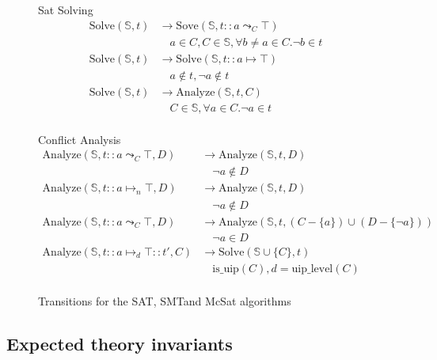 \begin{figure}
  \begin{center}
    Sat Solving
    \begin{align*}
      \text{Solve}(\mathbb{S}, t) &\rightarrow \text{Sove}(\mathbb{S}, t :: a \leadsto_C \top) \\
      &\quad a \in C, C \in \mathbb{S}, \forall b \neq a \in C. \neg b \in t \\
      \text{Solve}(\mathbb{S}, t) &\rightarrow \text{Solve}(\mathbb{S}, t :: a \mapsto \top) \\
      &\quad a \notin t, \neg a \notin t \\
      \text{Solve}(\mathbb{S}, t) &\rightarrow \text{Analyze}(\mathbb{S}, t, C) \\
      &\quad C \in \mathbb{S}, \forall a \in C. \neg a \in t \\
    \end{align*}

    Conflict Analysis
    \begin{align*}
      \text{Analyze}(\mathbb{S}, t :: a \leadsto_C \top, D) &\rightarrow \text{Analyze}(\mathbb{S}, t, D) \\
      &\quad \neg a \notin D \\
      \text{Analyze}(\mathbb{S}, t :: a \mapsto_n \top, D) &\rightarrow \text{Analyze}(\mathbb{S}, t, D) \\
      &\quad \neg a \notin D \\
      \text{Analyze}(\mathbb{S}, t :: a \leadsto_C \top, D) &\rightarrow \text{Analyze}(\mathbb{S}, t, (C - \{a\}) \cup (D - \{ \neg a\})) \\
      &\quad \neg a \in D \\
      \text{Analyze}(\mathbb{S}, t :: a \mapsto_d \top :: t', C) &\rightarrow \text{Solve}(\mathbb{S} \cup \{ C \}, t) \\
      &\quad \text{is\_uip}(C), d = \text{uip\_level}(C) \\
    \end{align*}

  \end{center}
  \caption{Transitions for the SAT, SMTand McSat algorithms}\label{fig:transitions}
\end{figure}

\subsection{Expected theory invariants}

